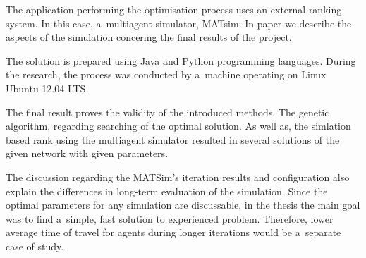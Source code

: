 \documentclass[twoside,12pt]{report}
\begin{document}
The application performing the optimisation process uses an external ranking system. In this case, a~multiagent simulator, MATsim. In paper we describe the aspects of the simulation concering the final results of the project. 

The solution is prepared using Java and Python programming languages. During the research, the process was conducted by a~machine operating on Linux Ubuntu 12.04 LTS.

The final result proves the validity of the introduced methods. The genetic algorithm, regarding searching of the optimal solution. As well as, the simlation based rank using the multiagent  simulator resulted in several solutions of the given network with given parameters.

The discussion regarding the MATSim's iteration results and configuration also 
explain the differences in long-term evaluation of the simulation. Since the optimal parameters for any simulation are discussable, in the thesis the main goal was to find a~simple, fast solution to experienced problem. Therefore, lower average time of travel for agents during longer iterations would be a~separate case of study.

\clearpage
\thispagestyle{empty}
\mbox{}


\clearpage

\end{document}
